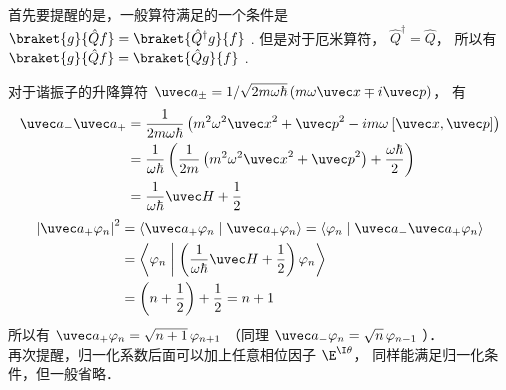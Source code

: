 
首先要提醒的是，一般算符满足的一个条件是 $\braket{g}{\hat Q f}=\braket{\hat Q^\dagger g}{ f}$ . 但是对于厄米算符， ${\hat Q^\dagger } = \hat Q$，  所以有 $\braket{g}{\hat Q f} = \braket{\hat Q g}{f}$ .

对于谐振子的升降算符 ${\uvec a_ \pm } = {1}/{\sqrt {2m\omega \hbar } }\left( {m\omega \uvec x \mp i\uvec p} \right)$， 有
\begin{equation}\begin{aligned}
{\uvec a_ - }{\uvec a_ + } &= \frac{1}{2m\omega \hbar }\left( {{m^2}{\omega ^2}{{\uvec x}^2} + {{\uvec p}^2} - im\omega {\kern 1pt} {\kern 1pt} [\uvec x,\uvec p]} \right) \\
&= \frac{1}{\omega \hbar }\left( {\frac{1}{2m}\left( {{m^2}{\omega ^2}{{\uvec x}^2} + {{\uvec p}^2}} \right) + \frac{\omega \hbar }{2}} \right) \\
&= \frac{1}{\omega \hbar }\uvec H + \frac{1}{2}
\end{aligned}\end{equation}
\begin{equation}\begin{aligned}
{\left| {{{\uvec a}_ + }{\varphi_n}} \right|^2} &= \left\langle {{{\uvec a}_ + }{\varphi_n}}
\mathrel{\left | {\vphantom {{{{\uvec a}_ + }{\varphi_n}} {{{\uvec a}_ + }{\varphi_n}}}}
\right. \kern-\nulldelimiterspace}
{{{\uvec a}_ + }{\varphi_n}} \right\rangle = \left\langle {\varphi_n}
\mathrel{\left | {\vphantom {{\varphi_n} {{{\uvec a}_ - }{{\uvec a}_ + }{\varphi_n}}}}
\right. \kern-\nulldelimiterspace}
{{{\uvec a}_ - }{{\uvec a}_ + }{\varphi_n}} \right\rangle  \\
&= \left\langle {\varphi_n}
\mathrel{\left | {\vphantom {{\varphi_n} {\left( {\frac{1}{\omega \hbar }\uvec H + \frac{1}{2}} \right){\varphi_n}}}}
\right. \kern-\nulldelimiterspace}
{\left( {\frac{1}{\omega \hbar }\uvec H + \frac{1}{2}} \right){\varphi_n}} \right\rangle \\
&= \left( {n + \frac{1}{2}} \right) + \frac{1}{2} = n + 1
\end{aligned}\end{equation}
所以有 ${\uvec a_ + }{\varphi_n} = \sqrt {n + 1}\, {\varphi_{n + 1}}$ （同理 ${\uvec a_ - }{\varphi_n} = \sqrt n \,{\varphi_{n - 1}}$ ）．\\
再次提醒，归一化系数后面可以加上任意相位因子 ${\E^{\I\theta }}$， 同样能满足归一化条件，但一般省略．
